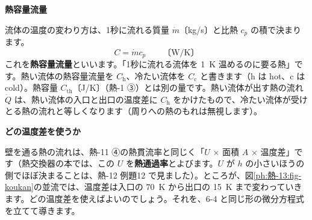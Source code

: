 \begin{bkfigure}
\label{ph:熱-13:fig-koukan}
\end{bkfigure}

\noindent\textbf{熱容量流量}\par\nobreak
流体の温度の変わり方は、1秒に流れる質量 $\dot m$〔kg/s〕と比熱 $c_p$ の積で決まります。
\[ C=\dot mc_p\qquad\text{〔W/K〕} \]
これを\textbf{熱容量流量}といいます。「1秒に流れる流体を \qty{1}{K} 温めるのに要る熱」です。熱い流体の熱容量流量を $C_{\mathrm h}$、冷たい流体を $C_{\mathrm c}$ と書きます（h は hot、c は cold）。熱容量 $C_{\mathrm{th}}$〔J/K〕（熱-1 ③）とは別の量です。熱い流体が出す熱の流れ $\dot Q$ は、熱い流体の入口と出口の温度差に $C_{\mathrm h}$ をかけたもので、冷たい流体が受けとる熱の流れと等しくなります（周りへの熱のもれは無視します）。

\noindent\textbf{どの温度差を使うか}\par\nobreak
壁を通る熱の流れは、熱-11 ④の熱貫流率と同じく「$U$ × 面積 $A$ × 温度差」です（熱交換器の本では、この $U$ を\textbf{熱通過率}とよびます。$U$ が $h$ の小さいほうの側でほぼ決まることは、熱-12 例題12 で見ました）。ところが、図\ref{ph:熱-13:fig-koukan}の並流では、温度差は入口の \qty{70}{K} から出口の \qty{15}{K} まで変わっていきます。どの温度差を使えばよいのでしょう。それを、6-4 と同じ形の微分方程式を立てて導きます。

